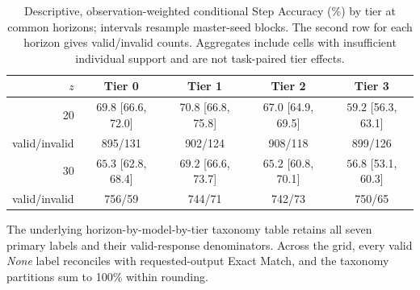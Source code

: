 \documentclass{article}
\begin{document}
\begin{table}[H]
\centering
\caption{Descriptive, observation-weighted conditional Step Accuracy (\%) by tier at common horizons; intervals resample master-seed blocks. The second row for each horizon gives valid/invalid counts. Aggregates include cells with insufficient individual support and are not task-paired tier effects.}
\label{tab:matched_horizon_tiers}
\scriptsize
\begin{tabular}{rcccc}
\toprule
$z$ & \textbf{Tier 0} & \textbf{Tier 1} & \textbf{Tier 2} & \textbf{Tier 3} \\
\midrule
20 & $69.8$ [66.6, 72.0] & $70.8$ [66.8, 75.8] & $67.0$ [64.9, 69.5] & $59.2$ [56.3, 63.1] \\
{\scriptsize valid/invalid} & 895/131 & 902/124 & 908/118 & 899/126 \\
30 & $65.3$ [62.8, 68.4] & $69.2$ [66.6, 73.7] & $65.2$ [60.8, 70.1] & $56.8$ [53.1, 60.3] \\
{\scriptsize valid/invalid} & 756/59 & 744/71 & 742/73 & 750/65 \\
\bottomrule
\end{tabular}
\end{table}

\begin{table}[H]
\centering
\caption{Failure taxonomy proportions pooled over observed model--tier cells at two fully covered horizons. \emph{None} denotes requested-output Exact Match. Denominators include valid responses only; percentages are observation-weighted across the cohort, not model averages.}
\label{tab:matched_horizon_taxonomy}
\scriptsize
{}
\end{table}

The underlying horizon-by-model-by-tier taxonomy table retains all seven
primary labels and their valid-response denominators. Across the grid, every
valid \emph{None} label reconciles with requested-output Exact Match, and
the taxonomy partitions sum to 100\% within rounding.
\end{document}

